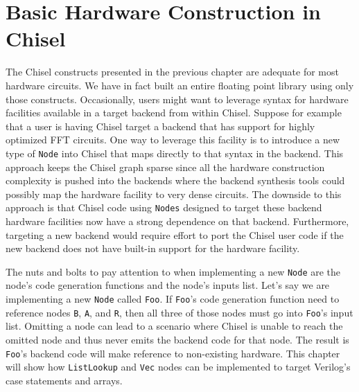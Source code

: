 \section{Basic Hardware Construction in Chisel}
The Chisel constructs presented in the previous chapter are adequate
for most hardware circuits. We have in fact built an entire floating
point library using only those constructs. Occasionally, users might
want to leverage syntax for hardware facilities available in a
target backend from within Chisel. Suppose for example that a user is
having Chisel target a backend that has support for highly optimized
FFT circuits. One way to leverage this facility is to introduce a new
type of {\tt Node} into Chisel that maps directly to that syntax in
the backend. This approach keeps the Chisel graph sparse since all the
hardware construction complexity is pushed into the backends where the
backend synthesis tools could possibly map the hardware facility to
very dense circuits. The downside to this approach is that Chisel code
using {\tt Nodes} designed to target these backend hardware facilities
now have a strong dependence on that backend. Furthermore, targeting a
new backend would require effort to port the Chisel user code if the
new backend does not have built-in support for the hardware facility.

The nuts and bolts to pay attention to when implementing a new 
{\tt Node} are the node's code generation functions and the node's
inputs list. Let's say we are implementing a new {\tt Node} called
{\tt Foo}. If {\tt Foo}'s code generation function need to reference
nodes {\tt B}, {\tt A}, and {\tt R}, then all three of those nodes
must go into {\tt Foo}'s input list. Omitting a node can lead to a
scenario where Chisel is unable to reach the omitted node and thus
never emits the backend code for that node. The result is 
{\tt Foo}'s backend code will make reference to non-existing hardware.
This chapter will show how {\tt ListLookup} and {\tt Vec} nodes can be
implemented to target Verilog's case statements and arrays.

